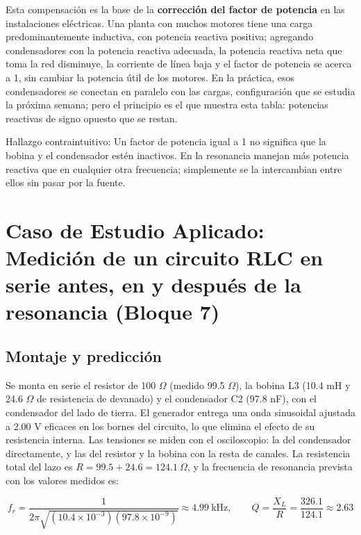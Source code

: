 \documentclass[11pt,letterpaper]{article}
\begin{document}
Esta compensación es la base de la \textbf{corrección del factor de potencia} en las instalaciones eléctricas. Una planta con muchos motores tiene una carga predominantemente inductiva, con potencia reactiva positiva; agregando condensadores con la potencia reactiva adecuada, la potencia reactiva neta que toma la red disminuye, la corriente de línea baja y el factor de potencia se acerca a 1, sin cambiar la potencia útil de los motores. En la práctica, esos condensadores se conectan en paralelo con las cargas, configuración que se estudia la próxima semana; pero el principio es el que muestra esta tabla: potencias reactivas de signo opuesto que se restan.

\begin{nota}{Hallazgo contraintuitivo:}
Un factor de potencia igual a 1 no significa que la bobina y el condensador estén inactivos. En la resonancia manejan más potencia reactiva que en cualquier otra frecuencia; simplemente se la intercambian entre ellos sin pasar por la fuente.
\end{nota}

\section{Caso de Estudio Aplicado: Medición de un circuito RLC en serie antes, en y después de la resonancia (Bloque 7)}

\subsection{Montaje y predicción}

Se monta en serie el resistor de 100 \ensuremath{\Omega} (medido 99.5 \ensuremath{\Omega}), la bobina L3 (10.4 mH y 24.6 \ensuremath{\Omega} de resistencia de devanado) y el condensador C2 (97.8 nF), con el condensador del lado de tierra. El generador entrega una onda sinusoidal ajustada a 2.00 V eficaces en los bornes del circuito, lo que elimina el efecto de su resistencia interna. Las tensiones se miden con el osciloscopio: la del condensador directamente, y las del resistor y la bobina con la resta de canales. La resistencia total del lazo es $R = 99.5 + 24.6 = 124.1\ \Omega$, y la frecuencia de resonancia prevista con los valores medidos es:

\begin{equation}
  f_r = \frac{1}{2\pi\sqrt{(10.4 \times 10^{-3})(97.8 \times 10^{-9})}} \approx 4.99\ \text{kHz}, \qquad Q = \frac{X_L}{R} = \frac{326.1}{124.1} \approx 2.63
\end{equation}
\end{document}
